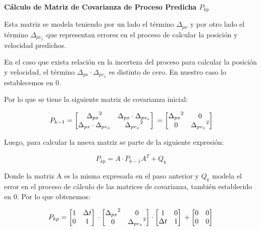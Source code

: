 \textbf{Cálculo de Matriz de Covarianza de Proceso Predicha $P_{kp}$} \mbox{} \vspace{10pt}

Esta matriz se modela teniendo por un lado el término $\Delta_{px}$ y por otro lado el término $\Delta_{pv_x}$ que representan errores en el proceso de calcular la posición y velocidad predichos.

En el caso que exista relación en la incerteza del proceso para calcular la posición y velocidad, el término $\Delta_{px} \cdot \Delta_{pv_x}$ es distinto de cero. En nuestro caso lo establecemos en $0$.

Por lo que se tiene la siguiente matriz de covarianza inicial:

$$
P_{k-1} = \begin{bmatrix}
    {\Delta_{px}}^2 & \Delta_{px} \cdot \Delta_{pv_x} \\
    \Delta_{px} \cdot \Delta_{pv_x} & {\Delta_{pv_x}}^2 \\
    \end{bmatrix} \\
    = \begin{bmatrix}
    {\Delta_{px}}^2 & 0 \\
    0 & {\Delta_{pv_x}}^2 \\
    \end{bmatrix} 
$$

Luego, para calcular la nueva matriz se parte de la siguiente expresión:

$$ P_{kp} = A \cdot P_{k-1} A^T + Q_k $$

Donde la matriz A es la misma expresada en el paso anterior y $Q_k$ modela el error en el proceso de cálculo de las matrices de covarianza, también establecido en $0$. Por lo que obtenemos:

$$ P_{kp} =
    \begin{bmatrix}
    1 & \Delta t  \\
    0 & 1         \\
    \end{bmatrix} \\
    \cdot 
    \begin{bmatrix}
    {\Delta_{px}}^2 & 0   \\
    0 & {\Delta_{pv_x}}^2 \\
    \end{bmatrix}
    \cdot
    \begin{bmatrix}
    1 & 0           \\
    \Delta t & 1    \\
    \end{bmatrix}   \\
    +
    \begin{bmatrix}
    0 & 0  \\
    0 & 0  \\
    \end{bmatrix}  \\
$$

